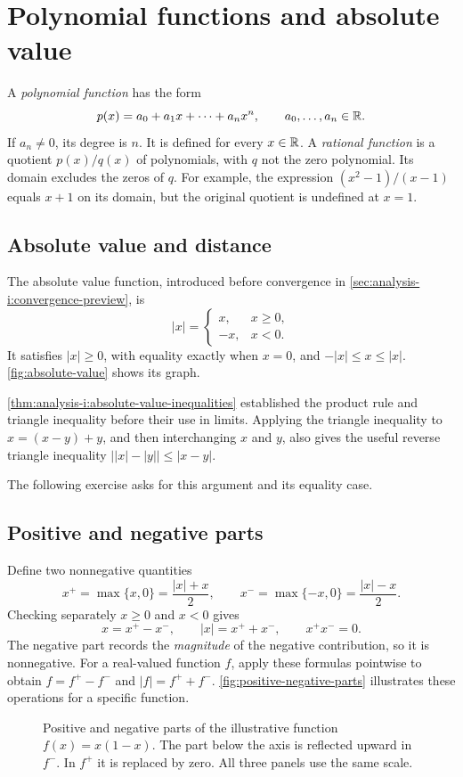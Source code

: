 \section{Polynomial functions and absolute value}
\label{sec:analysis-i:elementary-functions}

A \emph{polynomial function} has the form
\[
  p(x)=a_0+a_1x+\cdots+a_nx^n,\qquad a_0,\ldots,a_n\in\mathbb{R}.
\]
If $a_n\ne0$, its degree is $n$. It is defined for every $x\in\mathbb{R}$.
A \emph{rational function} is a quotient $p(x)/q(x)$ of polynomials,
with $q$ not the zero polynomial. Its domain excludes the zeros of $q$.
For example, the expression $(x^2-1)/(x-1)$ equals $x+1$ on its domain,
but the original quotient is undefined at $x=1$.

\subsection{Absolute value and distance}
The absolute value function, introduced before convergence in
\autoref{sec:analysis-i:convergence-preview}, is
\[
  |x|=\begin{cases}
    x,&x\geq0,\\
    -x,&x<0.
  \end{cases}
\]
It satisfies $|x|\geq0$, with equality exactly when $x=0$, and
$-|x|\leq x\leq|x|$. \autoref{fig:absolute-value} shows its graph.

\autoref{thm:analysis-i:absolute-value-inequalities} established
the product rule and triangle inequality before their use in limits.
Applying the triangle inequality to $x=(x-y)+y$, and then interchanging
$x$ and $y$, also gives the useful reverse triangle inequality
$\bigl||x|-|y|\bigr|\leq|x-y|$.

The following exercise asks for this argument and its equality case.


\subsection{Positive and negative parts}
Define two nonnegative quantities
\[
  x^+=\max\{x,0\}=\frac{|x|+x}{2},\qquad
  x^-=\max\{-x,0\}=\frac{|x|-x}{2}.
\]
Checking separately $x\geq0$ and $x<0$ gives
\[
  x=x^+-x^-,\qquad |x|=x^++x^-,\qquad x^+x^-=0.
\]
The negative part records the \emph{magnitude} of the negative contribution,
so it is nonnegative. For a real-valued function $f$, apply these formulas
pointwise to obtain $f=f^+-f^-$ and $|f|=f^++f^-$.
\autoref{fig:positive-negative-parts} illustrates these operations
for a specific function.
\begin{figure}[htbp]
  \centering
  
  \caption[Positive and negative parts of a function.]{Positive and negative parts of the illustrative function
    $f(x)=x(1-x)$. The part below the axis is reflected upward in $f^-$.
    In $f^+$ it is replaced by zero. All three panels use the same scale.}
  \label{fig:positive-negative-parts}
\end{figure}
